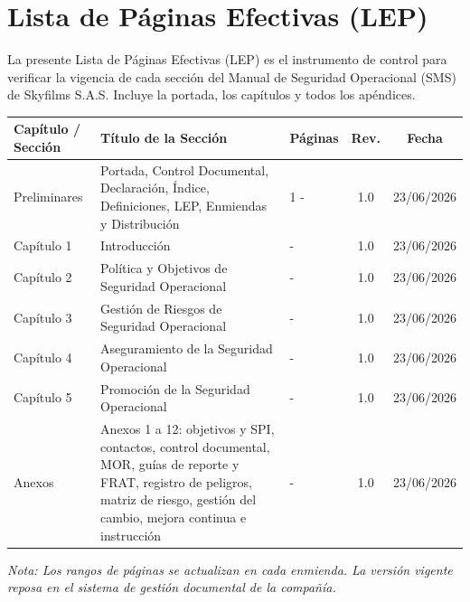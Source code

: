\section*{Lista de Páginas Efectivas (LEP)}

La presente Lista de Páginas Efectivas (LEP) es el instrumento de control para verificar la vigencia de cada sección del Manual de Seguridad Operacional (SMS) de Skyfilms S.A.S. Incluye la portada, los capítulos y todos los apéndices.

\begin{longtable}{|p{2.6cm}|p{6.2cm}|p{2.4cm}|c|c|}
\hline
\rowcolor[gray]{0.8}
\textbf{Capítulo / Sección} & \textbf{Título de la Sección} & \textbf{Páginas} & \textbf{Rev.} & \textbf{Fecha} \\ \hline
\endhead
Preliminares & Portada, Control Documental, Declaración, Índice, Definiciones, LEP, Enmiendas y Distribución & 1 - \pageref{fin_prelim} & 1.0 & 23/06/2026 \\ \hline
Capítulo 1 & Introducción & \pageref{inicio_cap1} - \pageref{fin_cap1} & 1.0 & 23/06/2026 \\ \hline
Capítulo 2 & Política y Objetivos de Seguridad Operacional & \pageref{inicio_cap2} - \pageref{fin_cap2} & 1.0 & 23/06/2026 \\ \hline
Capítulo 3 & Gestión de Riesgos de Seguridad Operacional & \pageref{inicio_cap3} - \pageref{fin_cap3} & 1.0 & 23/06/2026 \\ \hline
Capítulo 4 & Aseguramiento de la Seguridad Operacional & \pageref{inicio_cap4} - \pageref{fin_cap4} & 1.0 & 23/06/2026 \\ \hline
Capítulo 5 & Promoción de la Seguridad Operacional & \pageref{inicio_cap5} - \pageref{fin_cap5} & 1.0 & 23/06/2026 \\ \hline
Anexos & Anexos 1 a 12: objetivos y SPI, contactos, control documental, MOR, guías de reporte y FRAT, registro de peligros, matriz de riesgo, gestión del cambio, mejora continua e instrucción & \pageref{inicio_anexos} - \pageref{fin_anexos} & 1.0 & 23/06/2026 \\ \hline
\end{longtable}

\textit{Nota: Los rangos de páginas se actualizan en cada enmienda. La versión vigente reposa en el sistema de gestión documental de la compañía.}
